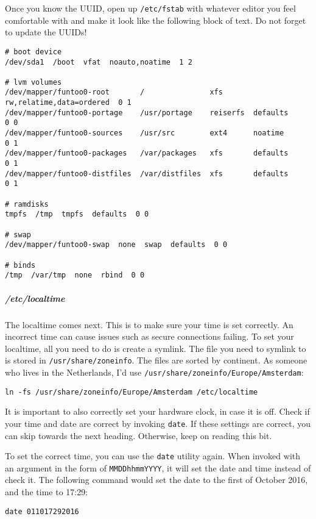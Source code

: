 Once you know the UUID, open up \texttt{/etc/fstab} with whatever editor
you feel comfortable with and make it look like the following block of
text. Do not forget to update the UUIDs!

\begin{verbatim}
# boot device
/dev/sda1  /boot  vfat  noauto,noatime  1 2

# lvm volumes
/dev/mapper/funtoo0-root       /               xfs       rw,relatime,data=ordered  0 1
/dev/mapper/funtoo0-portage    /usr/portage    reiserfs  defaults                  0 0
/dev/mapper/funtoo0-sources    /usr/src        ext4      noatime                   0 1
/dev/mapper/funtoo0-packages   /var/packages   xfs       defaults                  0 1
/dev/mapper/funtoo0-distfiles  /var/distfiles  xfs       defaults                  0 1

# ramdisks
tmpfs  /tmp  tmpfs  defaults  0 0

# swap
/dev/mapper/funtoo0-swap  none  swap  defaults  0 0

# binds
/tmp  /var/tmp  none  rbind  0 0
\end{verbatim}

\subparagraph{/etc/localtime}\label{etclocaltime}

The localtime comes next. This is to make sure your time is set
correctly. An incorrect time can cause issues such as secure connections
failing. To set your localtime, all you need to do is create a symlink.
The file you need to symlink to is stored in
\texttt{/usr/share/zoneinfo}. The files are sorted by continent. As
someone who lives in the Netherlands, I'd use
\texttt{/usr/share/zoneinfo/Europe/Amsterdam}:

\begin{verbatim}
ln -fs /usr/share/zoneinfo/Europe/Amsterdam /etc/localtime
\end{verbatim}

It is important to also correctly set your hardware clock, in case it is
off. Check if your time and date are correct by invoking \texttt{date}.
If these settings are correct, you can skip towards the next heading.
Otherwise, keep on reading this bit.

To set the correct time, you can use the \texttt{date} utility again.
When invoked with an argument in the form of \texttt{MMDDhhmmYYYY}, it
will set the date and time instead of check it. The following command
would set the date to the first of October 2016, and the time to 17:29:

\begin{verbatim}
date 011017292016
\end{verbatim}


